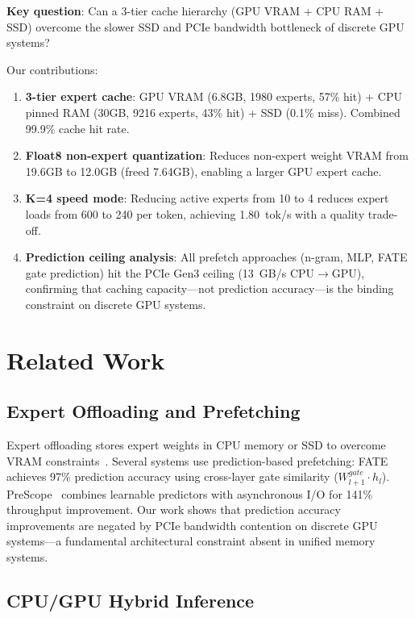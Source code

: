 \documentclass[conference]{IEEEtran}
\begin{document}
\textbf{Key question}: Can a 3-tier cache hierarchy (GPU VRAM + CPU RAM + SSD) overcome the slower SSD and PCIe bandwidth bottleneck of discrete GPU systems?

Our contributions:
\begin{enumerate}
    \item \textbf{3-tier expert cache}: GPU VRAM (6.8GB, 1980 experts, 57\% hit) + CPU pinned RAM (30GB, 9216 experts, 43\% hit) + SSD (0.1\% miss). Combined 99.9\% cache hit rate.
    \item \textbf{Float8 non-expert quantization}: Reduces non-expert weight VRAM from 19.6GB to 12.0GB (freed 7.64GB), enabling a larger GPU expert cache.
    \item \textbf{K=4 speed mode}: Reducing active experts from 10 to 4 reduces expert loads from 600 to 240 per token, achieving 1.80~tok/s with a quality trade-off.
    \item \textbf{Prediction ceiling analysis}: All prefetch approaches (n-gram, MLP, FATE gate prediction) hit the PCIe Gen3 ceiling (13~GB/s CPU$\to$GPU), confirming that caching capacity---not prediction accuracy---is the binding constraint on discrete GPU systems.
\end{enumerate}

\section{Related Work}

\subsection{Expert Offloading and Prefetching}

Expert offloading stores expert weights in CPU memory or SSD to overcome VRAM constraints~\cite{xue2024moeinfinity}. Several systems use prediction-based prefetching: FATE~\cite{fate2025} achieves 97\% prediction accuracy using cross-layer gate similarity ($W^{gate}_{l+1} \cdot h_l$). PreScope~\cite{prescope2025} combines learnable predictors with asynchronous I/O for 141\% throughput improvement. Our work shows that prediction accuracy improvements are negated by PCIe bandwidth contention on discrete GPU systems---a fundamental architectural constraint absent in unified memory systems.

\subsection{CPU/GPU Hybrid Inference}
\end{document}
